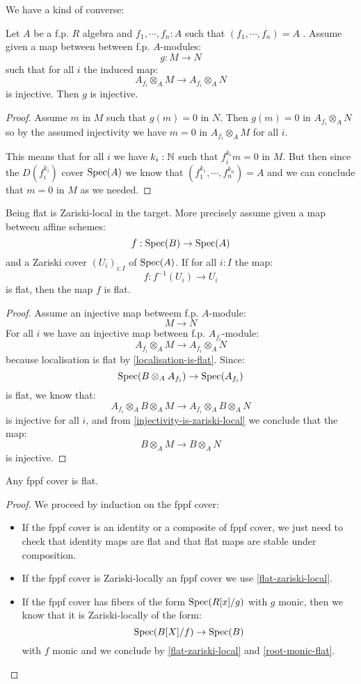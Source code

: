 We have a kind of converse:

\begin{lemma}\label{injectivity-is-zariski-local}
Let $A$ be a f.p. $R$ algebra and $f_1,\cdots,f_n:A$ such that $(f_1,\cdots,f_n) = A$ . Assume given a map between between f.p. $A$-modules:
\[g:M\to N\] 
such that for all $i$ the induced map:
\[A_{f_i}\otimes_AM \to A_{f_i}\otimes_AN\]
is injective. Then $g$ is injective.
\end{lemma}

\begin{proof}
Assume $m$ in $M$ such that $g(m)=0$ in $N$. Then $g(m) =0$ in $A_{f_i}\otimes_AN$ so by the assumed injectivity we have $m=0$ in $A_{f_i}\otimes_AM$ for all $i$.

This means that for all $i$ we have $k_i:\mathbb{N}$ such that $f_i^{k_i}m = 0$ in $M$. But then since the $D(f_i^{k_i})$ cover $\operatorname{Spec}(A)$ we know that $(f_1^{k_1},\cdots,f_n^{k_n}) = A$ and we can conclude that $m=0$ in $M$ as we needed.
\end{proof}

\begin{lemma}\label{flat-zariski-local}
Being flat is Zariski-local in the target. More precisely assume given a map between affine schemes:
\[f:\operatorname{Spec}(B)\to \operatorname{Spec}(A)\]
and a Zariski cover $(U_i)_{i:I}$ of $\operatorname{Spec}(A)$. If for all $i:I$ the map:
\[f : f^{-1}(U_i)\to U_i\]
is flat, then the map $f$ is flat.
\end{lemma}

\begin{proof}
Assume an injective map betweem f.p. $A$-module:
\[M\to N\]
For all $i$ we have an injective map between f.p. $A_{f_i}$-module:
\[A_{f_i}\otimes_AM\to A_{f_i}\otimes_AN\]
because localisation is flat by \cref{localisation-is-flat}. Since:
\[\operatorname{Spec}(B\otimes_AA_{f_i})\to \operatorname{Spec}(A_{f_i})\]
is flat, we know that:
\[A_{f_i}\otimes_AB\otimes_AM\to A_{f_i}\otimes_AB\otimes_AN\]
is injective for all $i$, and from \cref{injectivity-is-zariski-local} we conclude that the map:
\[B\otimes_AM\to B\otimes_AN\]
is injective.
\end{proof}

\begin{lemma}
Any fppf cover is flat.
\end{lemma}

\begin{proof}
We proceed by induction on the fppf cover:
\begin{itemize}
\item If the fppf cover is an identity or a composite of fppf cover, we just need to check that identity maps are flat and that flat maps are stable under composition.
\item If the fppf cover is Zariski-locally an fppf cover we use \cref{flat-zariski-local}.
\item If the fppf cover has fibers of the form $\operatorname{Spec}(R[x]/g)$ with $g$ monic, then we know that it is Zariski-locally of the form:
\[\operatorname{Spec}(B[X]/f)\to \operatorname{Spec}(B)\]
with $f$ monic and we conclude by \cref{flat-zariski-local} and \cref{root-monic-flat}.
\end{itemize}
\end{proof}

